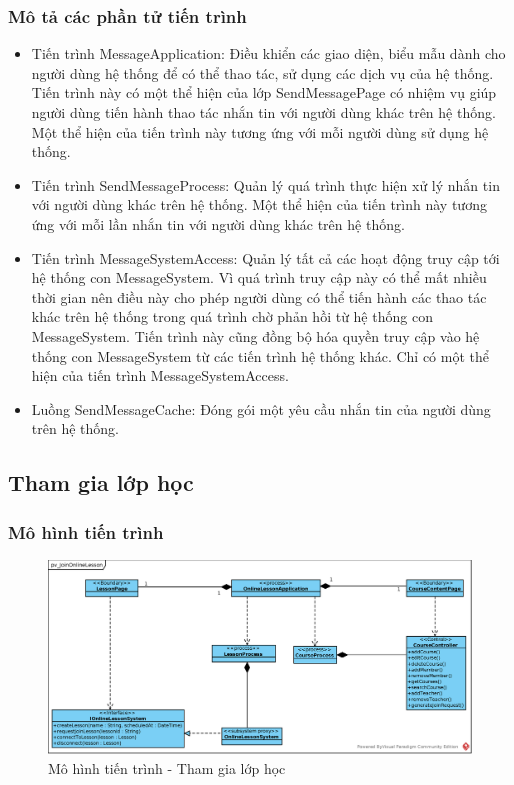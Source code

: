 \documentclass[./../main.tex]{subfiles}
\begin{document}
\subsubsection{Mô tả các phần tử tiến trình}
\begin{itemize}
	\item Tiến trình MessageApplication: Điều khiển các giao diện, biểu mẫu dành cho người dùng hệ thống để có thể thao tác, sử dụng các dịch vụ của hệ thống. Tiến trình này có một thể hiện của lớp SendMessagePage có nhiệm vụ giúp người dùng tiến hành thao tác nhắn tin với người dùng khác trên hệ thống.
	Một thể hiện của tiến trình này tương ứng với mỗi người dùng sử dụng hệ thống.
	\item Tiến trình SendMessageProcess: Quản lý quá trình thực hiện xử lý nhắn tin với người dùng khác trên hệ thống.
	Một thể hiện của tiến trình này tương ứng với mỗi lần nhắn tin với người dùng khác trên hệ thống.
	\item Tiến trình MessageSystemAccess: Quản lý tất cả các hoạt động truy cập tới hệ thống con MessageSystem. Vì quá trình truy cập này có thể mất nhiều thời gian nên điều này cho phép người dùng có thể tiến hành các thao tác khác trên hệ thống trong quá trình chờ phản hồi từ hệ thống con MessageSystem. Tiến trình này cũng đồng bộ hóa quyền truy cập vào hệ thống con MessageSystem từ các tiến trình hệ thống khác.
	Chỉ có một thể hiện của tiến trình MessageSystemAccess.
	\item Luồng SendMessageCache: Đóng gói một yêu cầu nhắn tin của người dùng trên hệ thống.
\end{itemize}

\subsection{Tham gia lớp học}

\subsubsection{Mô hình tiến trình}

\begin{figure}[H]
	\centering
	\includegraphics[width=\linewidth]{./images/pv_JoinOnlineLesson.eps}
	\caption{Mô hình tiến trình - Tham gia lớp học}
\end{figure}
\end{document}
